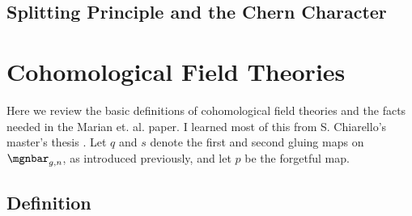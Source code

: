 \documentclass[raggedright, nofonts, notitlepage, openany, debug]{tufte-book}
\begin{document}
\subsection{Splitting Principle and the Chern Character}


\section{Cohomological Field Theories}
Here we review the basic definitions of cohomological field theories and the facts needed in the Marian et. al. paper. I learned most of this from S. Chiarello's master's thesis \cite{chiarello2016telemans}. Let $q$ and $s$ denote the first and second gluing maps on $\mgnbar_{g,n}$, as introduced previously, and let $p$ be the forgetful map.

\subsection{Definition}
\end{document}
